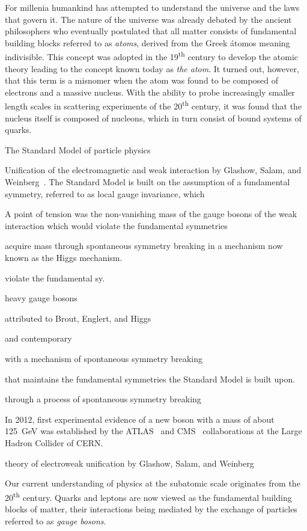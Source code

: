 For millenia humankind has attempted to understand the universe and the laws
that govern it. The nature of the universe was already debated by the ancient
philosophers who eventually postulated that all matter consists of fundamental
building blocks referred to as \emph{atoms}, derived from the Greek átomos
meaning indivisible. This concept was adopted in the 19\textsuperscript{th}
century to develop the atomic theory leading to the concept known today as
\emph{the atom}. It turned out, however, that this term is a misnomer when the
atom was found to be composed of electrons and a massive nucleus. With the
ability to probe increasingly smaller length scales in scattering experiments of
the 20\textsuperscript{th} century, it was found that the nucleus itself is
composed of nucleons, which in turn consist of bound systems of quarks.

The Standard Model of particle physics

Unification of the electromagnetic and weak interaction by Glashow, Salam, and
Weinberg~\cite{Glashow:1961tr,Salam:1964ry,Weinberg:1967tq}. The Standard Model
is built on the assumption of a fundamental symmetry, referred to as local gauge
invariance, which

A point of tension was the non-vanishing mass of the gauge bosons of the weak
interaction which would violate the fundamental symmetries

acquire mass through spontaneous symmetry breaking in a mechanism now known as
the Higgs mechanism.

violate the fundamental sy.

heavy gauge bosons

attributed to Brout, Englert, and Higgs~\cite{Englert:1964et,Higgs:1964pj}

and contemporary

with a mechanism of spontaneous symmetry breaking

that maintains the fundamental symmetries the Standard Model is built upon.

through a process of spontaneous symmetry breaking

In 2012, first experimental evidence of a new boson with a mass of about
\SI{125}{\GeV} was established by the ATLAS~\cite{HIGG-2012-27} and
CMS~\cite{CMS-HIG-12-028} collaborations at the Large Hadron Collider of CERN.

theory of electroweak unification by Glashow, Salam, and Weinberg



Our current understanding of physics at the subatomic scale originates from the
20\textsuperscript{th} century. Quarks and leptons are now viewed as the
fundamental building blocks of matter, their interactions being mediated by the
exchange of particles referred to as \emph{gauge bosons}.

